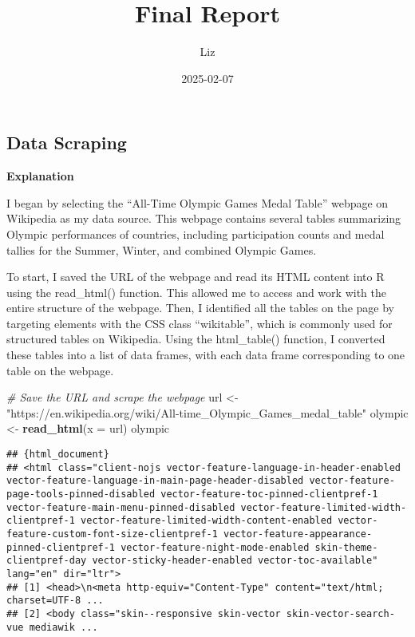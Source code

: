 \documentclass[
]{article}
\title{Final Report}
\author{Liz}
\date{2025-02-07}
\newenvironment{Shaded}{\begin{snugshade}}{\end{snugshade}}
\newcommand{\AttributeTok}[1]{\textcolor[rgb]{0.13,0.29,0.53}{#1}}
\newcommand{\CommentTok}[1]{\textcolor[rgb]{0.56,0.35,0.01}{\textit{#1}}}
\newcommand{\FunctionTok}[1]{\textcolor[rgb]{0.13,0.29,0.53}{\textbf{#1}}}
\newcommand{\NormalTok}[1]{#1}
\newcommand{\OtherTok}[1]{\textcolor[rgb]{0.56,0.35,0.01}{#1}}
\newcommand{\StringTok}[1]{\textcolor[rgb]{0.31,0.60,0.02}{#1}}
\begin{document}
\maketitle

\subsection{Data Scraping}\label{data-scraping}

\textbf{Explanation}

I began by selecting the ``All-Time Olympic Games Medal Table'' webpage
on Wikipedia as my data source. This webpage contains several tables
summarizing Olympic performances of countries, including participation
counts and medal tallies for the Summer, Winter, and combined Olympic
Games.

To start, I saved the URL of the webpage and read its HTML content into
R using the read\_html() function. This allowed me to access and work
with the entire structure of the webpage. Then, I identified all the
tables on the page by targeting elements with the CSS class
``wikitable'', which is commonly used for structured tables on
Wikipedia. Using the html\_table() function, I converted these tables
into a list of data frames, with each data frame corresponding to one
table on the webpage.

\begin{Shaded}
\begin{Highlighting}[]
\CommentTok{\# Save the URL and scrape the webpage}
\NormalTok{url }\OtherTok{\textless{}{-}} \StringTok{"https://en.wikipedia.org/wiki/All{-}time\_Olympic\_Games\_medal\_table"}
\NormalTok{olympic }\OtherTok{\textless{}{-}} \FunctionTok{read\_html}\NormalTok{(}\AttributeTok{x =}\NormalTok{ url)}
\NormalTok{olympic}
\end{Highlighting}
\end{Shaded}

\begin{verbatim}
## {html_document}
## <html class="client-nojs vector-feature-language-in-header-enabled vector-feature-language-in-main-page-header-disabled vector-feature-page-tools-pinned-disabled vector-feature-toc-pinned-clientpref-1 vector-feature-main-menu-pinned-disabled vector-feature-limited-width-clientpref-1 vector-feature-limited-width-content-enabled vector-feature-custom-font-size-clientpref-1 vector-feature-appearance-pinned-clientpref-1 vector-feature-night-mode-enabled skin-theme-clientpref-day vector-sticky-header-enabled vector-toc-available" lang="en" dir="ltr">
## [1] <head>\n<meta http-equiv="Content-Type" content="text/html; charset=UTF-8 ...
## [2] <body class="skin--responsive skin-vector skin-vector-search-vue mediawik ...
\end{verbatim}
\end{document}
